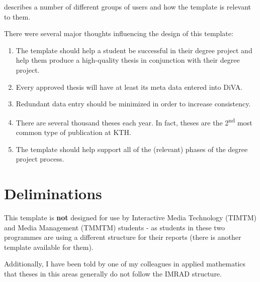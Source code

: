 \documentclass{article}
\begin{document}
 describes a number of different groups of users and how the template is relevant to them.

There were several major thoughts influencing the design of this template:
\begin{enumerate}[leftmargin=*, label=\textbf{Thought \arabic*}, ref={Thought \arabic*}]
    \item \label{thought:helpStudent} The template should help a student be successful in their degree project and help them produce a high-quality thesis in conjunction with their degree project.
    
    \item \label{thought:inDiVA} Every approved thesis will have at least its meta data entered into DiVA.
    
    \item \label{thought:reducingDataEntry} Redundant data entry should be minimized in order to increase consistency.
    
    \item \label{thought:volume} There are several thousand theses each year. In fact, theses are the 2\textsuperscript{nd} most common type of publication at KTH.
    
    \item \label{thought:process} The template should help support all of the (relevant) phases of the degree project process.
\end{enumerate}

\section{Deliminations}

This template is \textbf{not} designed for use by Interactive Media Technology (TIMTM) and Media Management (TMMTM) students - as students in these two programmes are using a different structure for their reports (there is another template available for them).

Additionally, I have been told by one of my colleagues in applied mathematics that theses in this areas generally do not follow the IMRAD structure.
\end{document}

